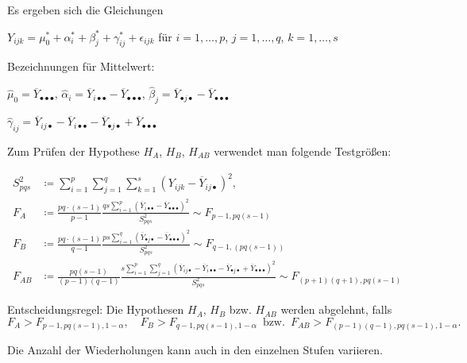 \documentclass{cheat-sheet}
\begin{document}
Es ergeben sich die Gleichungen

$Y_{ijk} = \mu_0^* + \alpha_i^* + \beta_j^* + \gamma_{ij}^* + \epsilon_{ijk}$ für $i = 1, \ldots, p$, $j = 1, \ldots, q$, $k = 1, \ldots, s$

Bezeichnungen für Mittelwert:

$\hat{\mu}_0 = \overline{Y}_{\bullet \bullet \bullet}$, $\hat{\alpha}_i = \overline{Y}_{i \bullet \bullet} - \overline{Y}_{\bullet \bullet \bullet}$, $\hat{\beta}_j = \overline{Y}_{\bullet j \bullet} - \overline{Y}_{\bullet \bullet \bullet}$

$\hat{\gamma}_{ij} = \overline{Y}_{ij \bullet} - \overline{Y}_{i \bullet \bullet} - \overline{Y}_{\bullet j \bullet} + \overline{Y}_{\bullet \bullet \bullet}$

Zum Prüfen der Hypothese $H_A$, $H_B$, $H_{AB}$ verwendet man folgende Testgrößen:

\begin{align*}
  S_{pqs}^2 & \coloneqq \sum_{i=1}^p \sum_{j=1}^q \sum_{k=1}^s (Y_{ijk} - \overline{Y}_{i j \bullet})^2, \\
  F_A & \coloneqq \frac{pq \cdot (s-1)}{p-1} \frac{qs \sum_{i=1}^p (\overline{Y}_{i \bullet \bullet} - \overline{Y}_{\bullet \bullet \bullet})^2}{S_{pqs}^2}
  \sim F_{p-1,pq(s-1)} \\
  F_B & \coloneqq \frac{pq \cdot (s-1)}{q-1} \frac{ps \sum_{i=1}^q (\overline{Y}_{\bullet j \bullet} - \overline{Y}_{\bullet \bullet \bullet})^2}{S_{pqs}^2}
  \sim F_{q-1,(pq(s-1))} \\
  F_{AB} & \coloneqq \frac{pq (s-1)}{(p-1)(q-1)} \frac{s \sum_{i=1}^p \sum_{j=1}^q (\overline{Y}_{i j \bullet} - \overline{Y}_{i \bullet \bullet} - \overline{Y}_{\bullet j \bullet} + \overline{Y}_{\bullet \bullet \bullet})^2}{S_{pqs}^2} \sim F_{(p+1)(q+1), pq(s-1)}
\end{align*}

Entscheidungsregel: %
Die Hypothesen $H_A$, $H_B$ bzw. $H_{AB}$ werden abgelehnt, falls
\[
  F_A > F_{p-1,pq(s-1),1-\alpha}, \quad
  F_B > F_{q-1,pq(s-1),1-\alpha}
  \enspace \text{bzw.} \enspace
  F_{AB} > F_{(p-1)(q-1),pq(s-1),1-\alpha}.
\]

\begin{bem}
  Die Anzahl der Wiederholungen kann auch in den einzelnen Stufen variieren.
\end{bem}
\end{document}

